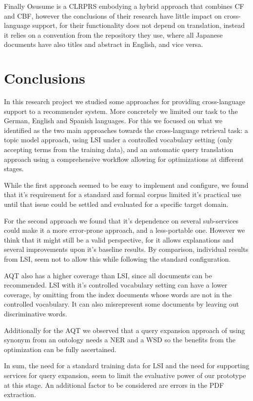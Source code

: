 \documentclass{llncs}
\begin{document}
Finally Osusume is a CLRPRS embodying a hybrid approach that combines CF and CBF\cite{uchiyama2011osusume}, however the conclusions of their research have little impact on cross-language support, for their functionality does not depend on translation, instead it relies on a convention from the repository they use, where all Japanese documents have also titles and abstract in English, and vice versa.
 
\section{Conclusions}

In this research project we studied some approaches for providing cross-language support to a recommender system. More concretely we limited our task to the German, English and Spanish languages. For this we focused on what we identified as the two main approaches towards the cross-language retrieval task: a topic model approach, using LSI under a controlled vocabulary setting (only accepting terms from the training data), and an automatic query translation approach using a comprehensive workflow allowing for optimizations at different stages. 

While the first approach seemed to be easy to implement and configure, we found that it's requirement for a standard and formal corpus limited it's practical use until that issue could be settled and evaluated for a specific target domain. 

For the second approach we found that it's dependence on several sub-services could make it a more error-prone approach, and a less-portable one. However we think that it might still be a valid perspective, for it allows explanations and several improvements upon it's baseline results. By comparison, individual results from LSI, seem not to allow this while following the standard configuration. 

AQT also has a higher coverage than LSI, since all documents can be recommended. LSI with it's controlled vocabulary setting can have a lower coverage, by omitting from the index documents whose words are not in the controlled vocabulary. It can also misrepresent some documents by leaving out discriminative words.

Additionally for the AQT we observed that a query expansion approach of using synonym from an ontology needs a NER and a WSD so the benefits from the optimization can be fully ascertained.

In sum, the need for a standard training data for LSI and the need for supporting services for query expansion, seem to limit the evaluative power of our prototype at this stage. An additional factor to be considered are errors in the PDF extraction.
\end{document}
